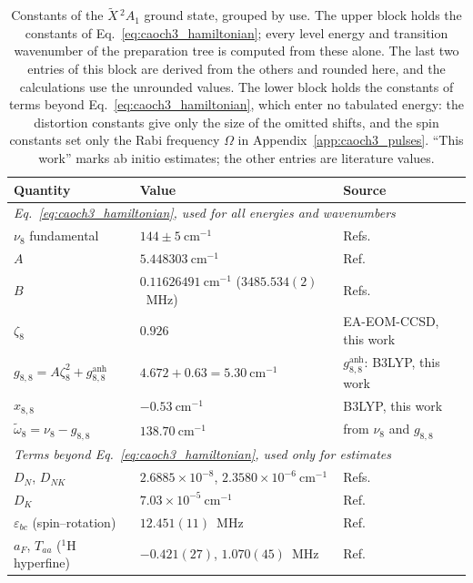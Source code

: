\begin{table}[h]
\centering
\small
\caption{Constants of the $\widetilde X\,{}^2A_1$ ground state, grouped by use. The upper block holds the constants of Eq.~\eqref{eq:caoch3_hamiltonian}; every level energy and transition wavenumber of the preparation tree is computed from these alone. The last two entries of this block are derived from the others and rounded here, and the calculations use the unrounded values. The lower block holds the constants of terms beyond Eq.~\eqref{eq:caoch3_hamiltonian}, which enter no tabulated energy: the distortion constants give only the size of the omitted shifts, and the spin constants set only the Rabi frequency $\Omega$ in Appendix~\ref{app:caoch3_pulses}. ``This work'' marks ab initio estimates; the other entries are literature values.}
\label{tab:caoch3_constants}
\begin{tabular}{lll}
\toprule
Quantity & Value & Source\\
\midrule
\multicolumn{3}{l}{\emph{Eq.~\eqref{eq:caoch3_hamiltonian}, used for all energies and wavenumbers}}\\
$\nu_8$ fundamental & $144\pm5\ \mathrm{cm^{-1}}$ & Refs.~\cite{Jacox2003,Kozyryev2019}\\
$A$ & $5.448303\ \mathrm{cm^{-1}}$ & Ref.~\cite{Crozet2002}\\
$B$ & $0.11626491\ \mathrm{cm^{-1}}$ ($3485.534(2)$~MHz) & Refs.~\cite{Namiki1998,Crozet2002}\\
$\zeta_8$ & $0.926$ & EA-EOM-CCSD, this work\\
$g_{8,8}=A\zeta_8^2+g^{\mathrm{anh}}_{8,8}$ & $4.672+0.63=5.30\ \mathrm{cm^{-1}}$ & $g^{\mathrm{anh}}_{8,8}$: B3LYP, this work\\
$x_{8,8}$ & $-0.53\ \mathrm{cm^{-1}}$ & B3LYP, this work\\
$\tilde\omega_8=\nu_8-g_{8,8}$ & $138.70\ \mathrm{cm^{-1}}$ & from $\nu_8$ and $g_{8,8}$\\
\midrule
\multicolumn{3}{l}{\emph{Terms beyond Eq.~\eqref{eq:caoch3_hamiltonian}, used only for estimates}}\\
$D_N$, $D_{NK}$ & $2.6885\times10^{-8}$, $2.3580\times10^{-6}\ \mathrm{cm^{-1}}$ & Refs.~\cite{Namiki1998,Crozet2002}\\
$D_K$ & $7.03\times10^{-5}\ \mathrm{cm^{-1}}$ & Ref.~\cite{Crozet2002}\\
$\varepsilon_{bc}$ (spin--rotation) & $12.451(11)$~MHz & Ref.~\cite{Namiki1998}\\
$a_F$, $T_{aa}$ (${}^1$H hyperfine) & $-0.421(27)$, $1.070(45)$~MHz & Ref.~\cite{Namiki1998}\\
\bottomrule
\end{tabular}
\end{table}
